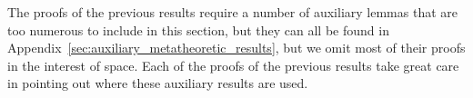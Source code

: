 The proofs of the previous results require a number of auxiliary
lemmas that are too numerous to include in this section, but they can
all be found in Appendix~\ref{sec:auxiliary_metatheoretic_results},
but we omit most of their proofs in the interest of space.  Each of
the proofs of the previous results take great care in pointing out
where these auxiliary results are used.

